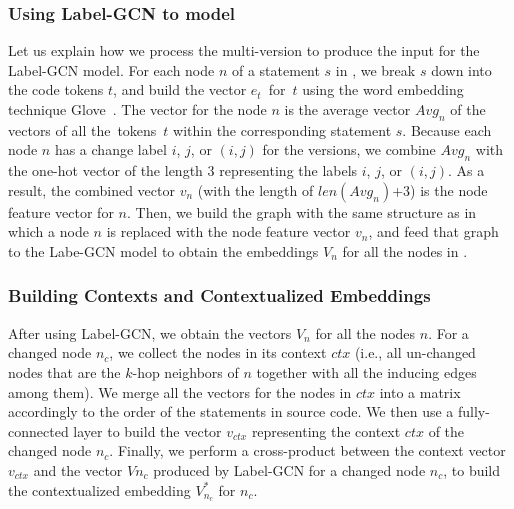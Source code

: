 \subsubsection{{\bf Using Label-GCN to model {\mvpdg}}}
\label{sec:preprocess}
Let us explain how we process the multi-version {\mvpdg} to produce
the input for the Label-GCN model. For each node $n$ of a statement
$s$ in {\mvpdg}, we break $s$ down into the code tokens $t$, and build
the vector $e_t$~for~$t$ using the word embedding technique
Glove~\cite{glove2014}. The vector for the node $n$ is the average vector
$Avg_n$ of the vectors of all the~tokens~$t$ within the corresponding
statement $s$. Because each node $n$ has a change label $i$, $j$, or
$(i,j)$ for the versions, we combine $Avg_n$ with the one-hot vector
of the length 3 representing the labels $i$, $j$, or $(i,j)$. As a
result, the combined vector $v_n$ (with the length of $len(Avg_n)$+3)
is the node feature vector for $n$. Then, we build the graph with the
same structure as {\mvpdg} in which a node $n$ is replaced with the
node feature vector $v_n$, and feed that graph to the Labe-GCN model to obtain
the embeddings $V_n$ for all the nodes in {\mvpdg}.




\subsubsection{{\bf Building Contexts and Contextualized Embeddings}}
After using Label-GCN, we obtain the vectors $V_n$ for all the nodes
$n$. For a changed node $n_c$, we collect the nodes in its context
$ctx$ (i.e., all un-changed nodes that are the $k$-hop neighbors of $n$
together with all the inducing edges among them). We merge all the
vectors for the nodes in $ctx$ into a matrix accordingly to the order
of the statements in source code. We then use a fully-connected layer
to build the vector $v_{ctx}$ representing the context $ctx$ of the
changed node $n_c$.
%
Finally, we perform a cross-product between the context vector $v_{ctx}$ and
the vector $V{n_c}$ produced by Label-GCN for a changed node $n_c$, to
build the contextualized embedding $V^{*}_{n_c}$ for $n_c$.

